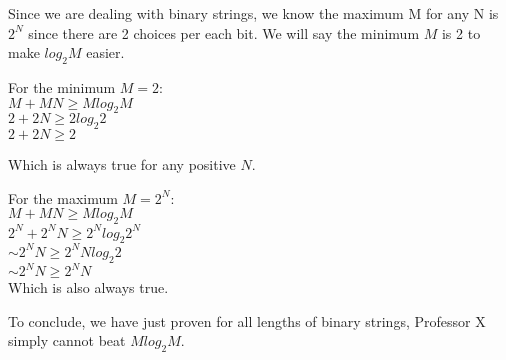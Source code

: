 \begin{problem}
\begin{questions}
Since we are dealing with binary strings, we know the maximum M for any N is $2^N$ since there are 2 choices per each bit. We will say the minimum $M$ is 2 to make $log_2{M}$ easier.

For the minimum $M=2$:\\
$M + MN \geq M log_2{M}$\\
$2 + 2N \geq 2 log_2{2}$\\
$2 + 2N \geq 2$

Which is always true for any positive $N$.

For the maximum $M=2^N$:\\
$M + MN \geq M log_2{M}$\\
$2^N + 2^{N}N \geq 2^N log_2{2^N}$\\
$\sim 2^{N}N \geq 2^{N} Nlog_2{2}$\\
$\sim 2^{N}N \geq 2^{N} N$\\

Which is also always true.

To conclude, we have just proven for all lengths of binary strings, Professor X simply cannot beat $M log_2{M}$.

\end{questions}
\end{problem}

\SUBMITMSG{}
\DEFAULTGRADING{}

